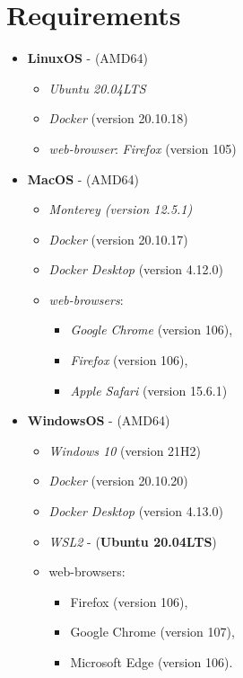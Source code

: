 \documentclass[
  a4paper,
  oneside,
  open=any]{scrreport}
\providecommand{\tightlist}{%
  \setlength{\itemsep}{0pt}\setlength{\parskip}{0pt}}\usepackage{longtable,booktabs,array}
\begin{document}
\hypertarget{requirements}{%
\section*{Requirements}\label{requirements}}

\begin{itemize}
\tightlist
\item
  \textbf{LinuxOS} - (AMD64)

  \begin{itemize}
  \tightlist
  \item
    \emph{Ubuntu 20.04LTS}
  \item
    \emph{Docker} (version 20.10.18)
  \item
    \emph{web-browser}: \emph{Firefox} (version 105)
  \end{itemize}
\item
  \textbf{MacOS} - (AMD64)

  \begin{itemize}
  \tightlist
  \item
    \emph{Monterey (version 12.5.1)}
  \item
    \emph{Docker} (version 20.10.17)
  \item
    \emph{Docker Desktop} (version 4.12.0)
  \item
    \emph{web-browsers}:

    \begin{itemize}
    \tightlist
    \item
      \emph{Google Chrome} (version 106),
    \item
      \emph{Firefox} (version 106),
    \item
      \emph{Apple Safari} (version 15.6.1)
    \end{itemize}
  \end{itemize}
\item
  \textbf{WindowsOS} - (AMD64)

  \begin{itemize}
  \tightlist
  \item
    \emph{Windows 10} (version 21H2)
  \item
    \emph{Docker} (version 20.10.20)
  \item
    \emph{Docker Desktop} (version 4.13.0)
  \item
    \emph{WSL2} - (\textbf{Ubuntu 20.04LTS})
  \item
    web-browsers:

    \begin{itemize}
    \tightlist
    \item
      Firefox (version 106),
    \item
      Google Chrome (version 107),
    \item
      Microsoft Edge (version 106).
    \end{itemize}
  \end{itemize}
\end{itemize}
\end{document}
